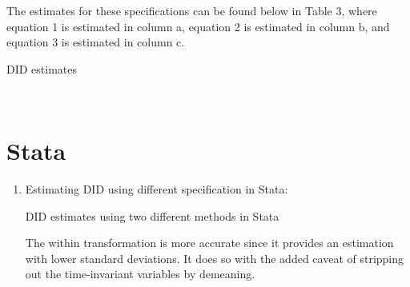 \documentclass{article}
\begin{document}
\begin{enumerate}
The estimates for these specifications can be found below in Table 3, where equation 1 is estimated in column a, equation 2 is estimated in column b, and equation 3 is estimated in column c.

\begin{table}[H]\centering
    \begin{threeparttable}
    \caption{DID estimates}
    \label{t1:DID}
    
    \begin{tablenotes}
    \end{tablenotes}
    \end{threeparttable}
\end{table}
    \\
\end{enumerate} 
   
\section*{Stata}
    
\begin{enumerate}

\item Estimating DID using different specification in Stata:
\begin{table}[H]\centering
    \begin{threeparttable}
    \caption{DID estimates using two different methods in Stata}
    \label{t3:stata}
    
    \end{threeparttable}
\end{table}

    The within transformation is more accurate since it provides an estimation with lower standard deviations. It does so with the added caveat of stripping out the time-invariant variables by demeaning. 

    
   
\end{enumerate}
   
\end{document}
